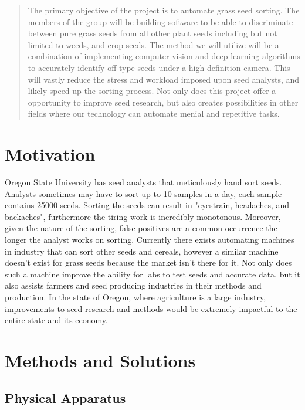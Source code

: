 \documentclass[onecolumn, draftclsnofoot,10pt, compsoc]{IEEEtran}
\begin{document}
\begin{titlepage}
\begin{singlespace}
\begin{abstract}
        	The primary objective of the project is to automate grass seed sorting. The members of the group will be building software to be able to discriminate between pure grass seeds from all other plant seeds including but not limited to weeds, and crop seeds. The method we will utilize will be a combination of implementing computer vision and deep learning algorithms to accurately identify off type seeds under a high definition camera. This will vastly reduce the stress and workload imposed upon seed analysts, and likely speed up the sorting process. Not only does this project offer a opportunity to improve seed research, but also creates possibilities in other fields where our technology can automate menial and repetitive tasks.
        \end{abstract}     
    \end{singlespace}
\end{titlepage}
\newpage
{}
\tableofcontents
\clearpage

\section{Motivation}
Oregon State University has seed analysts that meticulously hand sort seeds. Analysts sometimes may have to sort up to 10 samples in a day, each sample contains 25000 seeds. Sorting the seeds can result in "eyestrain, headaches, and backaches", furthermore the tiring work is incredibly monotonous. Moreover, given the nature of the sorting, false positives are a common occurrence the longer the analyst works on sorting. Currently there exists automating machines in industry that can sort other seeds and cereals, however a similar machine doesn't exist for grass seeds because the market isn't there for it. Not only does such a machine improve the ability for labs to test seeds and accurate data, but it also assists farmers and seed producing industries in their methods and production. In the state of Oregon, where agriculture is a large industry, improvements to seed research and methods would be extremely impactful to the entire state and its economy. 

\section{Methods and Solutions}

\subsection{Physical Apparatus}
\end{document}
